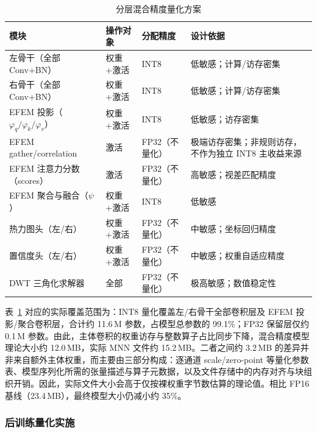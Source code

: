 \begin{table}[htbp]
  \centering
  \small
\caption{分层混合精度量化方案}
  \label{tab:precision_allocation}
  \begin{tabular}{@{}p{}p{}p{}p{}@{}}
    \toprule
    模块 & 操作对象 & 分配精度 & 设计依据 \\
    \midrule
    左骨干（全部 Conv+BN）                  & 权重+激活 & INT8 & 低敏感；计算/访存密集 \\
    右骨干（全部 Conv+BN）                  & 权重+激活 & INT8 & 低敏感；计算/访存密集 \\
    EFEM 投影（$\varphi_q/\varphi_k/\varphi_v$）& 权重+激活 & INT8 & 低敏感；访存密集 \\
    EFEM gather/correlation               & 激活 & FP32（不量化） & 极端访存密集；非规则访存，不作为独立 INT8 主收益来源 \\
    EFEM 注意力分数（scores）               & 激活 & FP32（不量化）   & 高敏感；视差匹配精度 \\
    EFEM 聚合与融合（$\psi$）               & 权重+激活 & INT8 & 低敏感 \\
    热力图头（左/右）                       & 权重+激活 & FP32（不量化）& 中敏感；坐标回归精度 \\
    置信度头（左/右）                       & 权重+激活 & FP32（不量化）& 中敏感；权重自适应精度 \\
    DWT 三角化求解器                        & 全部 & FP32（不量化）   & 极高敏感；数值稳定性 \\
    \bottomrule
  \end{tabular}
\end{table}

表~\ref{tab:precision_allocation} 对应的实际覆盖范围为：INT8 量化覆盖左/右骨干全部卷积层及 EFEM 投影/聚合卷积层，合计约 11.6\,M 参数，占模型总参数的 99.1\%；FP32 保留层仅约 0.1\,M 参数。由此，主体卷积的权重访存与整数算子占比同步下降，混合精度模型理论大小约 12.0\,MB，实际 MNN 文件约 15.2\,MB。二者之间约 3.2\,MB 的差异并非来自额外主体权重，而主要由三部分构成：逐通道 scale/zero-point 等量化参数表、模型序列化所需的张量描述与算子元数据，以及文件存储中的内存对齐与块组织开销。因此，实际文件大小会高于仅按裸权重字节数估算的理论值。相比 FP16 基线（23.4\,MB），最终模型大小仍减小约 35\%。

\subsubsection{后训练量化实施}

